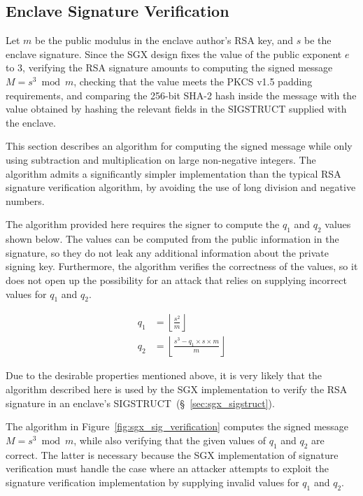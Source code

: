 \subsection{Enclave Signature Verification}
\label{sec:sgx_rsa_check}

Let $m$ be the public modulus in the enclave author's RSA key, and $s$ be the
enclave signature. Since the SGX design fixes the value of the public exponent
$e$ to $3$, verifying the RSA signature amounts to computing the signed
message $M = s^3 \bmod m$, checking that the value meets the PKCS v1.5 padding
requirements, and comparing the 256-bit SHA-2 hash inside the message with the
value obtained by hashing the relevant fields in the SIGSTRUCT supplied with
the enclave.

This section describes an algorithm for computing the signed message while only
using subtraction and multiplication on large non-negative integers. The
algorithm admits a significantly simpler implementation than the typical RSA
signature verification algorithm, by avoiding the use of long division and
negative numbers.

The algorithm provided here requires the signer to compute the $q_1$ and
$q_2$ values shown below. The values can be computed from the public
information in the signature, so they do not leak any additional information
about the private signing key. Furthermore, the algorithm verifies the
correctness of the values, so it does not open up the possibility for an attack
that relies on supplying incorrect values for $q_1$ and $q_2$.

\begin{align*}
q_1 & = \left\lfloor \frac{s^2}{m} \right\rfloor \\
q_2 & = \left\lfloor \frac{s^3 - q_1 \times s \times m}{m} \right\rfloor
\end{align*}

Due to the desirable properties mentioned above, it is very likely that the
algorithm described here is used by the SGX implementation to verify the RSA
signature in an enclave's SIGSTRUCT~(\S~\ref{sec:sgx_sigstruct}).

The algorithm in Figure~\ref{fig:sgx_sig_verification} computes the signed
message $M = s^3 \bmod m$, while also verifying that the given values of $q_1$
and $q_2$ are correct. The latter is necessary because the SGX implementation
of signature verification must handle the case where an attacker attempts to
exploit the signature verification implementation by supplying invalid values
for $q_1$ and $q_2$.

